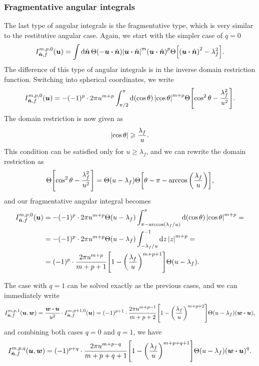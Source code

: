 \documentclass[aps,prl,preprint,groupedaddress,10pt]{revtex4-2}
\begin{document}
\subsubsection{Fragmentative angular integrals}
The last type of angular integrals is the fragmentative type, which is very
similar to the restitutive angular case. Again, we start with the simpler case of
$q=0$
\begin{equation}
    I_{\bn,f}^{m,p,0}\pqty{\bu}=\int\dd{\bn}\Theta\pqty{-\bu\vdot\bn}
    \abs{\bu\vdot\bn}^m\pqty{\bu\vdot\bn}^p
    \Theta\bqty{\pqty{\bu\vdot\bn}^2-\lambda_f^2}.
\end{equation}
The difference of this type of angular integrals is in the inverse domain restriction
function. Switching into spherical coordinates, we write
\begin{equation}
    I_{\bn,f}^{m,p,0}\pqty{\bu}=-(-1)^p\cdot 2\pi u^{m+p}\int_{\pi/2}^{\pi}
    \dd{\pqty{\cos\theta}}\abs{\cos\theta}^{m+p}
    \Theta\bqty{\cos^2\theta-\frac{\lambda_f^2}{u^2}}.
\end{equation}
The domain restriction is now given as
\begin{equation}
    \abs{\cos\theta}\geqslant\frac{\lambda_f}{u}.
\end{equation}
This condition can be satisfied only for $u\geqslant\lambda_f$, and we can rewrite
the domain restriction as
\begin{equation}
    \Theta\bqty{\cos^2\theta-\frac{\lambda_f^2}{u^2}}=
    \Theta\pqty{u-\lambda_f}\Theta\bqty{\theta-\pi-\arccos\pqty{\frac{\lambda_f}{u}}},
\end{equation}
and our fragmentative angular integral becomes
\begin{equation}
    \begin{split}
        I_{\bn,f}^{m,p,0}\pqty{\bu}&=-(-1)^p\cdot 2\pi u^{m+p}\Theta\pqty{u-\lambda_f}
        \int_{\pi-\arccos(\lambda_f/u)}^{\pi}\dd{\pqty{\cos\theta}}\abs{\cos\theta}^{m+p}=\\
        &=-(-1)^p\cdot 2\pi u^{m+p}\Theta\pqty{u-\lambda_f}
        \int_{-\lambda_f/u}^{-1}\dd{z}\abs{z}^{m+p}=\\
        &=(-1)^p\cdot\frac{2\pi u^{m+p}}{m+p+1}\bqty{1-\pqty{\frac{\lambda_f}{u}}^{m+p+1}}
        \Theta\pqty{u-\lambda_f}.
    \end{split}
\end{equation}

The case with $q=1$ can be solved exactly as the previous cases, and we can immediately
write
\begin{equation}
    I_{\bn,f}^{m,p,1}(\bu,\bw)=\frac{\bw\vdot\bu}{u^2}\cdot I_{\bn,f}^{m,p+1,0}(\bu)=
    (-1)^{p+1}\cdot\frac{2\pi u^{m+p-1}}{m+p+2}\bqty{1-\pqty{\frac{\lambda_f}{u}}^{m+p+2}}
    \Theta\pqty{u-\lambda_f}\pqty{\bw\vdot\bu},
\end{equation}
and combining both cases $q=0$ and $q=1$, we have
\begin{equation}
    I_{\bn,f}^{m,p,q}(\bu,\bw)=(-1)^{p+q}\cdot\frac{2\pi u^{m+p-q}}{m+p+q+1}
    \bqty{1-\pqty{\frac{\lambda_f}{u}}^{m+p+q+1}}
    \Theta\pqty{u-\lambda_f}\pqty{\bw\vdot\bu}^q.
\end{equation}
\end{document}
